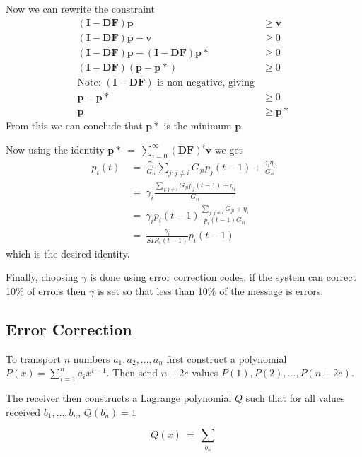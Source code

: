 \documentclass[a4paper]{article}
\begin{document}
Now we can rewrite the constraint 
\begin{align*}
	(\mathbf{I}-\mathbf{DF})\mathbf{p} &\geq \mathbf{v} \\
	(\mathbf{I}-\mathbf{DF})\mathbf{p} - \mathbf{v} &\geq 0 \\
	(\mathbf{I}-\mathbf{DF})\mathbf{p} - (\mathbf{I}-\mathbf{DF})\mathbf{p*} &\geq 0 \\
	(\mathbf{I}-\mathbf{DF})(\mathbf{p} - \mathbf{p*}) &\geq 0 \\
	\text{Note: $(\mathbf{I}-\mathbf{DF})$ is non-negative, giving} \\
	\mathbf{p} - \mathbf{p*} &\geq 0 \\
	\mathbf{p} &\geq \mathbf{p*} 
\end{align*}
From this we can conclude that $\mathbf{p*}$ is the minimum $\mathbf{p}$. 

Now using the identity $\mathbf{p*}\ =\ \sum\limits_{i=0}^{\infty}(\mathbf{DF})^i\mathbf{v}$ we get 
\begin{align*}
	p_i(t)\ 
	&=\ \frac{\gamma_i}{G_{ii}}\sum\limits_{j:j\neq i}G_{ji}p_j(t-1) + \frac{\gamma_i\eta_i}{G_{ii}} \\
	&=\ \gamma_i\frac{\sum\limits_{j:j\neq i}G_{ji}p_j(t-1)+\eta_i}{G_{ii}}\\
	&=\ \gamma_ip_i(t-1)\frac{\sum\limits_{j:j\neq i}G_{ji}+\eta_i}{p_i(t-1)G_{ii}}\\
	&=\ \frac{\gamma_i}{SIR_i(t-1)}p_i(t-1) 
\end{align*}
which is the desired identity.

Finally, choosing $\gamma$ is done using error correction codes, if the system can correct 10\% of errors then $\gamma$ is set so that less than 10\% of the message is errors.
	
\subsection{Error Correction}

To transport $n$ numbers $a_1, a_2, ..., a_n$ first construct a polynomial $P(x) = \sum\limits_{i=1}^{n} a_ix^{i-1}$. Then send $n + 2e$ values $P(1), P(2), ..., P(n+2e)$. 

The receiver then constructs a Lagrange polynomial $Q$ such that for all values received $b_1, ..., b_n$, $Q(b_n) = 1$

\begin{center}
$$Q(x)\ =\ \sum\limits_{b_n} $$

\end{center}
\end{document}
